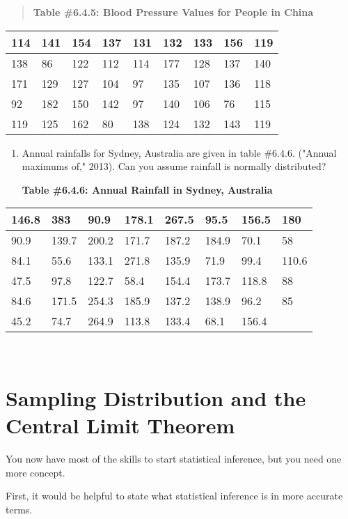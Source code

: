 \documentclass[]{book}
\begin{document}
\begin{quote}
\textbf{Table \#6.4.5: Blood Pressure Values for People in China}
\end{quote}

\begin{longtable}[]{@{}lllllllll@{}}
\toprule
114 & 141 & 154 & 137 & 131 & 132 & 133 & 156 & 119\tabularnewline
\midrule
\endhead
138 & 86 & 122 & 112 & 114 & 177 & 128 & 137 & 140\tabularnewline
171 & 129 & 127 & 104 & 97 & 135 & 107 & 136 & 118\tabularnewline
92 & 182 & 150 & 142 & 97 & 140 & 106 & 76 & 115\tabularnewline
119 & 125 & 162 & 80 & 138 & 124 & 132 & 143 & 119\tabularnewline
\bottomrule
\end{longtable}

\begin{enumerate}
\def\labelenumi{\arabic{enumi}.}
\setcounter{enumi}{3}
\item
  Annual rainfalls for Sydney, Australia are given in table \#6.4.6. ("Annual maximums of," 2013). Can you assume rainfall is normally distributed?

  \textbf{Table \#6.4.6: Annual Rainfall in Sydney, Australia}
\end{enumerate}

\begin{longtable}[]{@{}llllllll@{}}
\toprule
146.8 & 383 & 90.9 & 178.1 & 267.5 & 95.5 & 156.5 & 180\tabularnewline
\midrule
\endhead
90.9 & 139.7 & 200.2 & 171.7 & 187.2 & 184.9 & 70.1 & 58\tabularnewline
84.1 & 55.6 & 133.1 & 271.8 & 135.9 & 71.9 & 99.4 & 110.6\tabularnewline
47.5 & 97.8 & 122.7 & 58.4 & 154.4 & 173.7 & 118.8 & 88\tabularnewline
84.6 & 171.5 & 254.3 & 185.9 & 137.2 & 138.9 & 96.2 & 85\tabularnewline
45.2 & 74.7 & 264.9 & 113.8 & 133.4 & 68.1 & 156.4 &\tabularnewline
\bottomrule
\end{longtable}

\textbf{\\
}

\hypertarget{sampling-distribution-and-the-central-limit-theorem}{%
\section{Sampling Distribution and the Central Limit Theorem}\label{sampling-distribution-and-the-central-limit-theorem}}

You now have most of the skills to start statistical inference, but you need one more concept.

First, it would be helpful to state what statistical inference is in more accurate terms.
\end{document}
